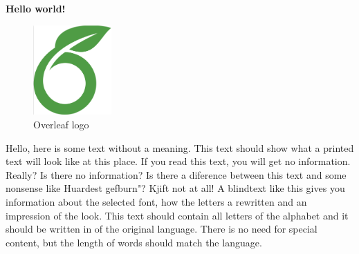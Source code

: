 \documentclass[../main.tex]{subfiles}
\begin{document}
    \textbf{Hello world!}

    \begin{figure}[bh]
    \centering
    \includegraphics[width=3cm]{images/overleaf-logo.png}

    \label{fig:img1}
    \caption{Overleaf logo}
    \end{figure}

    Hello, here is some text without a meaning.  This text should show what a printed text will look like at this place.  If you read this text, you will get no information.  Really?  Is there no information?  Is there a diference between this text and some nonsense like Huardest gefburn"?  Kjift  not at all!  A blindtext like this gives you information about the selected font, how the letters a rewritten and an impression of the look.  This text should contain all letters of the alphabet and it should be written in of the original language.  There is no need for special content, but the length of words should match the language.
\end{document}
